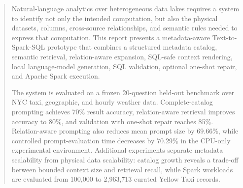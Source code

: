 \documentclass[11pt,a4paper]{article}
\begin{document}
\begin{abstract}

Natural-language analytics over heterogeneous data lakes requires a system to
identify not only the intended computation, but also the physical datasets,
columns, cross-source relationships, and semantic rules needed to express that
computation. This report presents a metadata-aware Text-to-Spark-SQL prototype
that combines a structured metadata catalog, semantic retrieval,
relation-aware expansion, SQL-safe context rendering, local language-model
generation, SQL validation, optional one-shot repair, and Apache Spark
execution.

The system is evaluated on a frozen 20-question held-out benchmark over NYC
taxi, geographic, and hourly weather data. Complete-catalog prompting achieves
70\% result accuracy, relation-aware retrieval improves accuracy to 80\%, and
validation with one-shot repair reaches 85\%. Relation-aware prompting also
reduces mean prompt size by 69.66\%, while controlled prompt-evaluation time
decreases by 70.29\% in the CPU-only experimental environment. Additional
experiments separate metadata scalability from physical data scalability:
catalog growth reveals a trade-off between bounded context size and retrieval
recall, while Spark workloads are evaluated from 100,000 to 2,963,713 curated
Yellow Taxi records.

\end{abstract}

\clearpage

\tableofcontents

\clearpage
{}















\clearpage






\clearpage
\appendix


\end{document}
